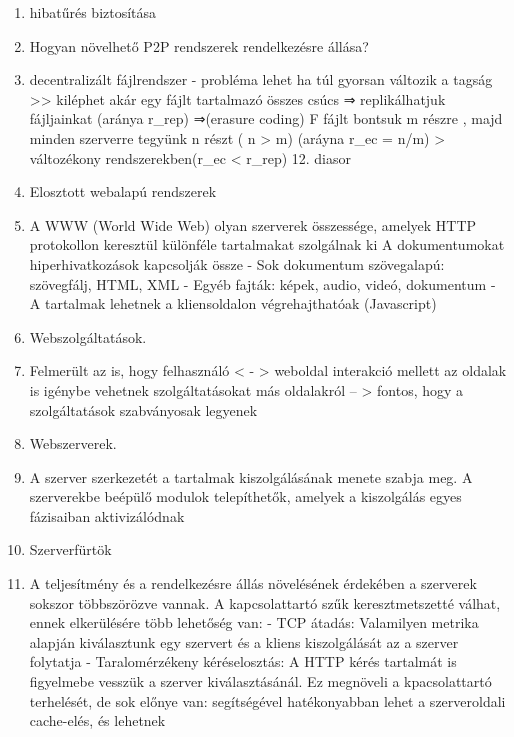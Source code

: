 \documentclass[twoside, a4paper, 12pt]{article}
\begin{document}
\begin{enumerate}
            \item hibatűrés biztosítása
            \item  Hogyan növelhető P2P rendszerek rendelkezésre állása?
            \item decentralizált fájlrendszer
                - probléma lehet ha túl gyorsan változik a tagság >> kiléphet akár egy fájlt tartalmazó összes csúcs
                ⇒ replikálhatjuk fájljainkat (aránya r\_rep)
                ⇒(erasure coding) F fájlt bontsuk m részre , majd minden szerverre
                tegyünk n részt ( n > m) (aráyna r\_ec = n/m) 
                > változékony rendszerekben(r\_ec < r\_rep)
                12. diasor
            \item  Elosztott webalapú rendszerek
            \item A WWW (World Wide Web) olyan szerverek összessége, amelyek HTTP protokollon keresztül különféle tartalmakat szolgálnak ki
                A dokumentumokat hiperhivatkozások kapcsolják össze
                - Sok dokumentum szövegalapú: szövegfálj, HTML, XML
                - Egyéb fajták: képek, audio, videó, dokumentum
                - A tartalmak lehetnek a kliensoldalon végrehajthatóak (Javascript)
            \item  Webszolgáltatások.
            \item Felmerült az is, hogy felhasználó < - > weboldal interakció mellett az oldalak is igénybe vehetnek szolgáltatásokat más
                oldalakról -- > fontos, hogy a szolgáltatások szabványosak legyenek
            \item  Webszerverek.
            \item A szerver szerkezetét a tartalmak kiszolgálásának menete szabja meg. A szerverekbe beépülő modulok telepíthetők,
                amelyek a kiszolgálás egyes fázisaiban aktivizálódnak
            \item  Szerverfürtök    
            \item A teljesítmény és a rendelkezésre állás növelésének érdekében a szerverek sokszor többszörözve vannak.
                A kapcsolattartó szűk keresztmetszetté válhat, ennek elkerülésére több lehetőség van:
                - TCP átadás: Valamilyen metrika alapján kiválasztunk egy szervert és a kliens kiszolgálását az a szerver folytatja
                - Taralomérzékeny kéréselosztás: A HTTP kérés tartalmát is figyelmebe vesszük a szerver kiválasztásánál. Ez megnöveli
                a kpacsolattartó terhelését, de sok előnye van: segítségével hatékonyabban lehet a szerveroldali cache-elés, és lehetnek

\end{enumerate}
\end{document}
